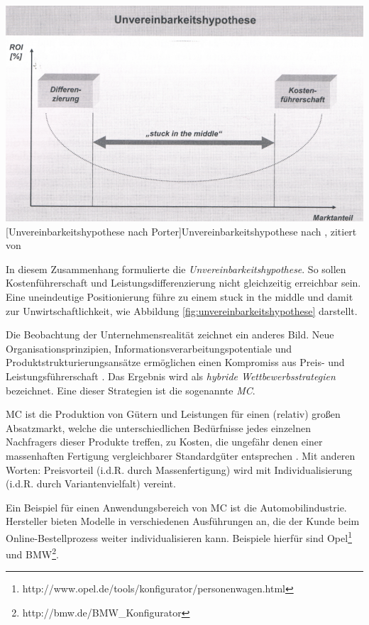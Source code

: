 \documentclass[11pt, a4paper, titlepage, listof=totoc, bibliography=totoc, index=totoc, twoside, openright, headings=normal]{scrreprt}
\begin{document}
\vspace{1em}
\begin{minipage}{\linewidth}
	\centering
	\includegraphics[width=0.7\linewidth]{Abbildungen/unvereinbarkeitshypothese.png}
	[Unvereinbarkeitshypothese nach Porter]{Unvereinbarkeitshypothese nach \cite{porter80}, zitiert von \cite{schuh05}}
	\label{fig:unvereinbarkeitshypothese}
\end{minipage}
\vspace{0.3em}

In diesem Zusammenhang formulierte \citeauthor{porter80} die \emph{Unvereinbarkeitshypothese}. So sollen Kostenführerschaft und Leistungsdifferenzierung nicht gleichzeitig erreichbar sein. Eine uneindeutige Positionierung führe zu einem \glqq stuck in the middle\grqq{} und damit zur Unwirtschaftlichkeit, wie Abbildung \ref{fig:unvereinbarkeitshypothese} darstellt.

Die Beobachtung der Unternehmensrealität zeichnet ein anderes Bild. Neue Organisationsprinzipien, Informationsverarbeitungspotentiale und Produktstrukturierungsansätze ermöglichen einen Kompromiss aus Preis- und Leistungsführerschaft \citep{schuh05}. Das Ergebnis wird als \emph{hybride Wettbewerbsstrategien} bezeichnet. Eine dieser Strategien ist die sogenannte \emph{\ac{MC}}.

\ac{MC} ist die \glqq Produktion von Gütern und Leistungen für einen (relativ) großen Absatzmarkt, welche die unterschiedlichen Bedürfnisse jedes einzelnen Nachfragers dieser Produkte treffen, zu Kosten, die ungefähr denen einer massenhaften Fertigung vergleichbarer Standardgüter entsprechen\grqq{} \citep{piller98}. Mit anderen Worten: Preisvorteil (\ac{i.d.R.} durch Massenfertigung) wird mit Individualisierung (\ac{i.d.R.} durch Variantenvielfalt) vereint.

Ein Beispiel für einen Anwendungsbereich von \ac{MC} ist die Automobilindustrie. Hersteller bieten  Modelle in verschiedenen Ausführungen an, die der Kunde beim Online-Bestellprozess weiter individualisieren kann. Beispiele hierfür sind Opel\footnote{http://www.opel.de/tools/konfigurator/personenwagen.html} und BMW\footnote{http://bmw.de/BMW\_Konfigurator}.
\end{document}
